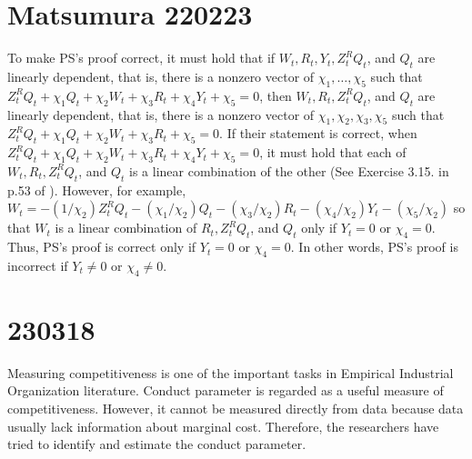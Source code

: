 \documentclass[11pt, a4paper]{article}
\begin{document}
\section{Matsumura 220223}


To make PS's proof correct, it must hold that if $W_{t}, R_{t}, Y_{t}, Z^{R}_{t}Q_{t}$, and $Q_{t}$ are linearly dependent, that is, there is a nonzero vector of $\chi_1, \ldots, \chi_5$ such that $Z^{R}_{t} Q_{t} + \chi_1 Q_{t} + \chi_2 W_{t} + \chi_3 R_{t} + \chi_4 Y_{t} + \chi_5 = 0$, then  $W_{t}, R_{t}, Z^{R}_{t}Q_{t}$, and $Q_{t}$ are linearly dependent, that is, there is a nonzero vector of $\chi_1,\chi_2, \chi_3, \chi_5$ such that $Z^{R}_{t} Q_{t} + \chi_1 Q_{t} + \chi_2 W_{t} + \chi_3 R_{t} + \chi_5 = 0$. 
If their statement is correct, when $Z^{R}_{t} Q_{t} + \chi_1 Q_{t} + \chi_2 W_{t} + \chi_3 R_{t} + \chi_4 Y_{t} + \chi_5 = 0$, it must hold that each of $W_{t}, R_{t}, Z^{R}_{t}Q_{t}$, and $Q_{t}$ is a linear combination of the other (See Exercise 3.15. in p.53 of \cite{abadir2005matrix}). 
However, for example, $W_{t}=-(1/\chi_2) Z^{R}_{t} Q_{t} - (\chi_1/\chi_2)  Q_{t} - (\chi_3/\chi_2) R_{t} - (\chi_4/\chi_2) Y_{t} - (\chi_5/\chi_2)$ so that $W_{t}$ is a linear combination of $R_{t}, Z^{R}_{t}Q_{t}$, and $Q_{t}$ only if $Y_{t}=0$ or $\chi_4=0$. 
Thus, PS's proof is correct only if $Y_{t}=0$ or $\chi_4=0$. In other words, PS's proof is incorrect if $Y_{t}\neq 0$ or $\chi_4\neq 0$.


\section{230318}

Measuring competitiveness is one of the important tasks in Empirical Industrial Organization literature.
Conduct parameter is regarded as a useful measure of competitiveness. 
However, it cannot be measured directly from data because data usually lack information about marginal cost.
Therefore, the researchers have tried to identify and estimate the conduct parameter.
\end{document}
